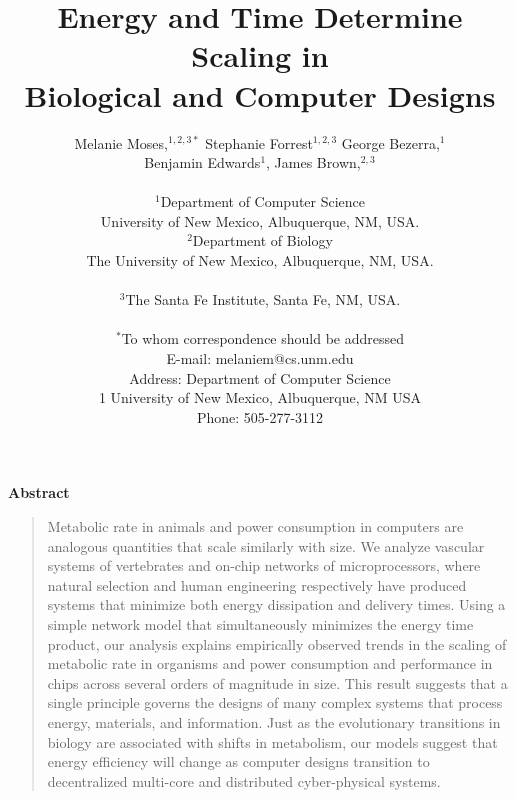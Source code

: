 \documentclass[12pt]{article}
\title{Energy and Time Determine Scaling in \\Biological and Computer Designs}
\author
{Melanie Moses,$^{1,2,3\ast}$ Stephanie Forrest$^{1,2,3}$ George Bezerra,$^{1}$ \\Benjamin Edwards$^{1}$, James Brown,$^{2,3}$ \\
\\
\normalsize{$^{1}$Department of Computer Science}\\
\normalsize{University of New Mexico, Albuquerque, NM, USA.}\\
\normalsize{$^{2}$Department of Biology}\\
\normalsize{The University of New Mexico, Albuquerque, NM, USA.}\\
\\
\normalsize{$^{3}$The Santa Fe Institute, Santa Fe, NM, USA.}\\
\\
\normalsize{$^\ast$To whom correspondence should be addressed}\\
\normalsize{E-mail: melaniem@cs.unm.edu}\\
\normalsize{Address: Department of Computer Science}\\
\normalsize{1 University of New Mexico, Albuquerque, NM USA}\\
\normalsize{Phone: 505-277-3112}\\
}
\newenvironment{sciabstract}{%
\begin{quote} \bf}
{\end{quote}}
\begin{document}
 

\newenvironment{caseof}{\setcounter{casenum}{1}}{\vskip.5\baselineskip}
\newcommand{\case}[2]{\vskip.5\baselineskip\par\noindent {\bfseries Case
\arabic{casenum}:} #1: #2\addtocounter{casenum}{1}}


\baselineskip24pt


\maketitle 


\newpage


\centerline{\Large{\bf Abstract}}

\begin{sciabstract}

  Metabolic rate in animals and power consumption in computers are analogous
  quantities that scale similarly with size.  We analyze vascular systems of
  vertebrates and on-chip networks of microprocessors, where natural selection
  and human engineering respectively have produced systems that minimize both energy dissipation
  and delivery times.   
  Using a simple network model that simultaneously minimizes the energy time product, our analysis explains
  empirically observed trends in the scaling of metabolic rate in organisms and
  power consumption and performance in chips across several orders of magnitude
  in size.  This result suggests that a single principle governs the designs of
  many complex systems that process energy, materials, and information. Just as
  the evolutionary transitions in biology are associated with shifts in
  metabolism, our models suggest that energy efficiency will change
  as computer designs transition to decentralized multi-core and
  distributed cyber-physical systems.

\end{sciabstract}
\end{document}
